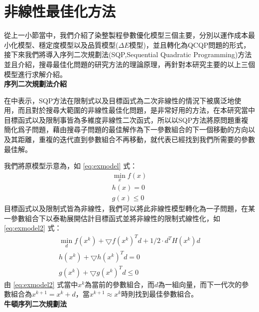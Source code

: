 \section{非線性最佳化方法}
\label{c:ch5.2}
從上一小節當中，我們介紹了染整製程參數優化模型三個主要，分別以運作成本最小化模型、穩定度模型以及品質模型($\Delta E$模型)，並且轉化為QCQP問題的形式，接下來我們將導入序列二次規劃法(SQP,Sequential Quadratic Programming)方法並且介紹，搜尋最佳化問題的研究方法的理論原理，再針對本研究主要的以上三個模型進行求解介紹。
\\\textbf{序列二次規劃法介紹}

在\cite{Gill.etc}中表示，SQP方法在限制式以及目標函式為二次非線性的情況下被廣泛地使用，而且對於搜尋大範圍的非線性最佳化問題，是非常好用的方法，在本研究當中目標函式以及限制事皆為多維度非線性二次函式，所以以SQP方法將原問題重複簡化爲子問題，藉由搜尋子問題的最佳解作為下一參數組合的下一個移動的方向以及其距離，重複的迭代直到參數組合不再移動，就代表已經找到我們所需要的參數最佳解。

我們將原模型示意為，如 \ref{eq:exmodel} 式：
\begin{equation}
	\begin{array}{c}
	\min_{x} f(x) \\
	h(x)=0 \\
	g(x)\leq 0
	\end{array}
\label{eq:exmodel}
\end{equation}
目標函式以及限制式皆為非線性，我們可以將此非線性模型轉化為一子問題，在某一參數組合下以泰勒展開估計目標函式並將非線性的限制式線性化，如 \ref{eq:exmodel2} 式：
\begin{equation}
	\begin{array}{c}
	\min_{d} f(x^{k})+ \bigtriangledown f(x^{k})^{T}d+1/2\cdot d^{T}H(x^{k})d\\
	h(x^{k})+ \bigtriangledown h(x^{k})^{T}d=0\\
	g(x^{k})+ \bigtriangledown g(x^{k})^{T}d\leq 0
	\end{array}
\label{eq:exmodel2}
\end{equation}
由 \ref{eq:exmodel2} 式當中$x^{k}$為當前的參數組合，而$d$為一組向量，而下一代次的參數組合為$x^{k+1}=x^{k}+d$，當$x^{k+1}\approx x^{k}$時則找到最佳參數組合。
\\ \textbf{牛頓序列二次規劃法}

